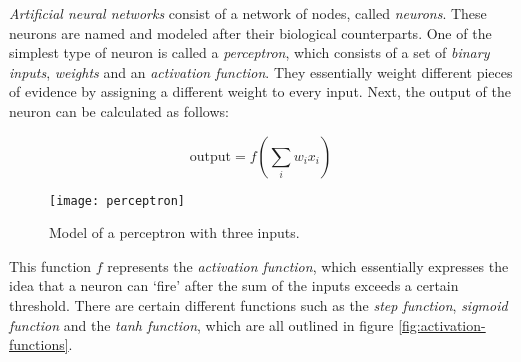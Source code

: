 \textit{Artificial neural networks} consist of a network of nodes, called \textit{neurons}.
These neurons are named and modeled after their biological counterparts.
One of the simplest type of neuron is called a \textit{perceptron}, which consists of a set of \textit{binary inputs}, \textit{weights} and an \textit{activation function}.
They essentially weight different pieces of evidence by assigning a different weight to every input.
Next, the output of the neuron can be calculated as follows:

$$\text{output} = f(\sum_{i} w_i x_i)$$

\begin{figure}[ht]
  \centering
  \texttt{[image: perceptron]}
  \caption{Model of a perceptron with three inputs.}
  \label{fig:perceptron}
\end{figure}

\newpage

This function $f$ represents the \textit{activation function}, which essentially expresses the idea that a neuron can `fire' after the sum of the inputs exceeds a certain threshold.
There are certain different functions such as the \textit{step function}, \textit{sigmoid function} and the \textit{tanh function},
which are all outlined in figure \ref{fig:activation-functions}.

